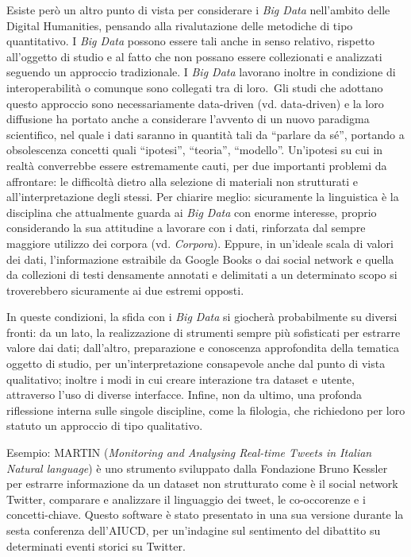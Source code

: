 \documentclass[
  b5paper,
  twoside,
  12pt,
  chapterprefix=false,
  bibliography=totocnumbered,
  parskip=false]{scrbook}
\begin{document}
Esiste però un altro punto di vista per considerare i \emph{Big Data}
nell'ambito delle Digital Humanities, pensando alla rivalutazione delle
metodiche di tipo quantitativo. I \emph{Big Data} possono essere tali anche
in senso relativo, rispetto all'oggetto di studio e al fatto che non
possano essere collezionati e analizzati seguendo un approccio
tradizionale. I \emph{Big Data} lavorano inoltre in condizione di
interoperabilità o comunque sono collegati tra di loro.~Gli studi che
adottano questo approccio sono necessariamente data-driven (vd.
data-driven) e la loro diffusione ha portato anche a considerare
l'avvento di un nuovo paradigma scientifico, nel quale i dati saranno in
quantità tali da \enquote{parlare da sé}, portando a obsolescenza concetti quali
\enquote{ipotesi}, \enquote{teoria}, \enquote{modello}. Un'ipotesi su cui in realtà converrebbe
essere estremamente cauti, per due importanti problemi da affrontare: le
difficoltà dietro alla selezione di materiali non strutturati e
all'interpretazione degli stessi. Per chiarire meglio: sicuramente la
linguistica è la disciplina che attualmente guarda ai \emph{Big Data} con
enorme interesse, proprio considerando la sua attitudine a lavorare con
i dati, rinforzata dal sempre maggiore utilizzo dei corpora (vd.
\emph{Corpora}). Eppure, in un'ideale scala di valori dei dati,
l'informazione estraibile da Google Books o dai social network e quella
da collezioni di testi densamente annotati e delimitati a un determinato
scopo si troverebbero sicuramente ai due estremi opposti.

In queste condizioni, la sfida con i \emph{Big Data} si giocherà
probabilmente su diversi fronti: da un lato, la realizzazione di
strumenti sempre più sofisticati per estrarre valore dai dati;
dall'altro, preparazione e conoscenza approfondita della tematica
oggetto di studio, per un'interpretazione consapevole anche dal punto di
vista qualitativo; inoltre i modi in cui creare interazione tra dataset
e utente, attraverso l'uso di diverse interfacce. Infine, non da ultimo,
una profonda riflessione interna sulle singole discipline, come la
filologia, che richiedono per loro statuto un approccio di tipo
qualitativo.

Esempio: MARTIN (\emph{Monitoring and Analysing Real-time Tweets in Italian
Natural language}) è uno strumento sviluppato dalla Fondazione Bruno
Kessler per estrarre informazione da un dataset non strutturato come è
il social network Twitter, comparare e analizzare il linguaggio dei
tweet, le co-occorenze e i concetti-chiave. Questo software è stato
presentato in una sua versione durante la sesta conferenza dell'AIUCD,
per un'indagine sul sentimento del dibattito su determinati eventi
storici su Twitter.
\end{document}
